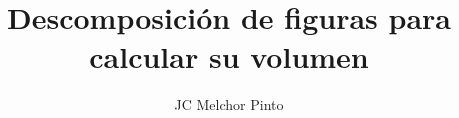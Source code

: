 \documentclass[12pt,addpoints,answers]{guia}
\title{Descomposición de figuras para calcular su volumen}
\author{JC Melchor Pinto}
\begin{document}
\INFO%
\begin{multicols}{2}
    
    
\end{multicols}
\begin{questions}
    \questionboxed[5]{}
    \questionboxed[5]{}
    \questionboxed[5]{}
    \ejemplosboxed[]
    \questionboxed[20]{}
    \questionboxed[20]{}
    \ejemplosboxed[]
    \questionboxed[15]{}
    \questionboxed[15]{}
    \questionboxed[15]{}
\end{questions}
\end{document}
